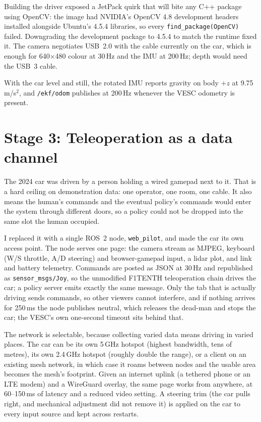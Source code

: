 \documentclass[12pt]{article}
\begin{document}
Building the driver exposed a JetPack quirk that will bite any C++ package using
OpenCV: the image had NVIDIA's OpenCV 4.8 development headers installed alongside
Ubuntu's 4.5.4 libraries, so every \texttt{find\_package(OpenCV)} failed. Downgrading
the development package to 4.5.4 to match the runtime fixed it. The camera negotiates
USB~2.0 with the cable currently on the car, which is enough for 640$\times$480 colour
at 30\,Hz and the IMU at 200\,Hz; depth would need the USB~3 cable.

With the car level and still, the rotated IMU reports gravity on body $+z$ at
9.75\,m/s$^2$, and \texttt{/ekf/odom} publishes at 200\,Hz whenever the VESC odometry
is present.

\section*{Stage 3: Teleoperation as a data channel}

The 2024 car was driven by a person holding a wired gamepad next to it. That is a hard
ceiling on demonstration data: one operator, one room, one cable. It also means the
human's commands and the eventual policy's commands would enter the system through
different doors, so a policy could not be dropped into the same slot the human occupied.

I replaced it with a single ROS~2 node, \texttt{web\_pilot}, and made the car its own
access point. The node serves one page: the camera stream as MJPEG, keyboard (W/S
throttle, A/D steering) and browser-gamepad input, a lidar plot, and link and battery
telemetry. Commands are posted as JSON at 30\,Hz and republished as
\texttt{sensor\_msgs/Joy}, so the unmodified F1TENTH teleoperation chain drives the car;
a policy server emits exactly the same message. Only the tab that is actually driving
sends commands, so other viewers cannot interfere, and if nothing arrives for 250\,ms the
node publishes neutral, which releases the dead-man and stops the car; the VESC's own
one-second timeout sits behind that.

The network is selectable, because collecting varied data means driving in varied places.
The car can be its own 5\,GHz hotspot (highest bandwidth, tens of metres), its own
2.4\,GHz hotspot (roughly double the range), or a client on an existing mesh network, in
which case it roams between nodes and the usable area becomes the mesh's footprint. Given
an internet uplink (a tethered phone or an LTE modem) and a WireGuard overlay, the same
page works from anywhere, at 60--150\,ms of latency and a reduced video setting. A
steering trim (the car pulls right, and mechanical adjustment did not remove it) is
applied on the car to every input source and kept across restarts.
\end{document}
